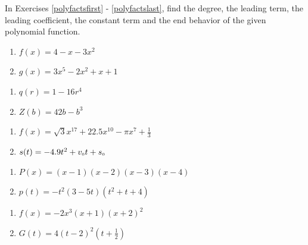 In Exercises \ref{polyfactsfirst} - \ref{polyfactslast}, find the degree, the leading term, the leading coefficient, the constant term and the end behavior of the given polynomial function.

\begin{multicols}{2}
\begin{enumerate}
\setcounter{enumi}{\value{HW}}
\item  $f(x) = 4-x-3x^2$ \label{polyfactsfirst}
\item  $g(x) = 3x^5 - 2x^2 + x + 1$

\setcounter{HW}{\value{enumi}}
\end{enumerate}
\end{multicols}

\begin{multicols}{2}
\begin{enumerate}
\setcounter{enumi}{\value{HW}}

\item $q(r) = 1 - 16r^{4}$
\item $Z(b) = 42b - b^{3}$

\setcounter{HW}{\value{enumi}}
\end{enumerate}
\end{multicols}

\begin{multicols}{2}
\begin{enumerate}
\setcounter{enumi}{\value{HW}}

\item $f(x) = \sqrt{3}x^{17} + 22.5x^{10} - \pi x^{7} + \frac{1}{3}$
\item $s(t) = -4.9t^{2} + v_{\mbox{\tiny $0$}}t + s_{\mbox{\tiny $0$}}$

\setcounter{HW}{\value{enumi}}
\end{enumerate}
\end{multicols}

\begin{multicols}{2}
\begin{enumerate}
\setcounter{enumi}{\value{HW}}

\item $P(x) = (x - 1)(x - 2)(x - 3)(x - 4)$
\item $p(t) = -t^2(3 - 5t)(t^{2} + t + 4)$

\setcounter{HW}{\value{enumi}}
\end{enumerate}
\end{multicols}

\begin{multicols}{2}
\begin{enumerate}
\setcounter{enumi}{\value{HW}}

\item $f(x) = -2x^3(x+1)(x+2)^2$
\item $G(t) = 4(t-2)^2\left(t+\frac{1}{2}\right)$ \label{polyfactslast}

\setcounter{HW}{\value{enumi}}
\end{enumerate}
\end{multicols}

